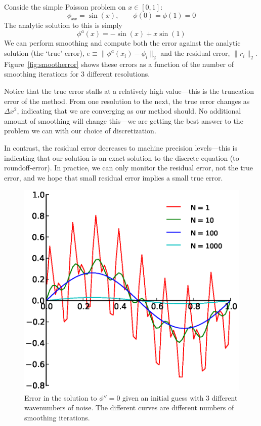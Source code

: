 Conside the simple Poisson problem on $x \in [0,1]$:
\begin{equation}
\phi_{xx} = \sin(x), \qquad \phi(0) = \phi(1) = 0
\end{equation}
The analytic solution to this is simply 
\begin{equation}
\phi^a(x) = -\sin(x) + x \sin(1)
\end{equation}
We can perform smoothing and compute both the error against the
analytic solution (the `true' error), $e \equiv \| \phi^a(x_i) - \phi_i \|_2$ and the
residual error, $\| r_i \|_2$.  Figure~\ref{fig:smootherror} shows these
errors as a function of the number of smoothing iterations for 3
different resolutions.

Notice that the true error stalls at a relatively high value---this is
the truncation error of the method.  From one resolution to the next,
the true error changes as $\Delta x^2$, indicating that we are
converging as our method should.  No additional amount of smoothing
will change this---we are getting the best answer to the problem we
can with our choice of discretization.

In contrast, the residual error decreases to machine precision
levels---this is indicating that our solution is an exact solution to
the discrete equation (to roundoff-error).
In practice, we can only monitor the residual error, not the true
error, and we hope that small residual error implies a small true
error.

\begin{figure}[t]
\centering
\includegraphics[width=0.8\linewidth]{smooth_error}
\caption[Smoothing of different wavenumbers.]{\label{fig:smooth} Error
  in the solution to $\phi'' = 0$ given an initial guess with 3
  different wavenumbers of noise.  The different curves are different
  numbers of smoothing iterations.}
\end{figure}


